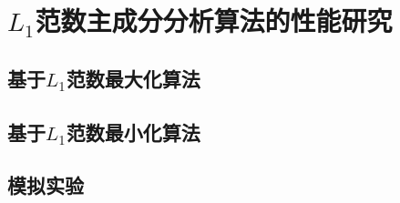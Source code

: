 \section{$L_1$范数主成分分析算法的性能研究}

\subsection{基于$L_1$范数最大化算法}

\subsection{基于$L_1$范数最小化算法}

\subsection{模拟实验}